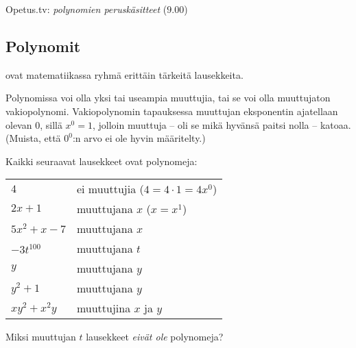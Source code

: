 {Opetus.tv: \emph{polynomien peruskäsitteet} ($9.00$)}

\subsection{Polynomit}

 ovat matematiikassa ryhmä erittäin tärkeitä lausekkeita.



Polynomissa voi olla yksi tai useampia muuttujia, tai se voi olla muuttujaton vakiopolynomi. Vakiopolynomin tapauksessa muuttujan eksponentin ajatellaan olevan $0$, sillä $x^0=1$, jolloin muuttuja -- oli se mikä hyvänsä paitsi nolla -- katoaa. (Muista, että $0^0$:n arvo ei ole hyvin määritelty.)
\newpage
\begin{esimerkki}
Kaikki seuraavat lausekkeet ovat polynomeja:
\begin{tabular}{ll}
$4$ &  ei muuttujia ($4=4\cdot 1 = 4x^0$)\\
$2x+1$ &  muuttujana $x$ ($x=x^1$)\\
$5x^2+x-7$ &   muuttujana $x$\\
$-3t^{100}$& muuttujana $t$\\
$y$& muuttujana $y$\\
$y^2+1$& muuttujana $y$\\
$xy^2+x^2y$& muuttujina $x$ ja $y$
\end{tabular}
\end{esimerkki}

\begin{esimerkki}
Miksi muuttujan $t$ lausekkeet 
\emph{eivät ole} polynomeja?
	\begin{esimratk}
	\end{esimratk}
\end{esimerkki}

